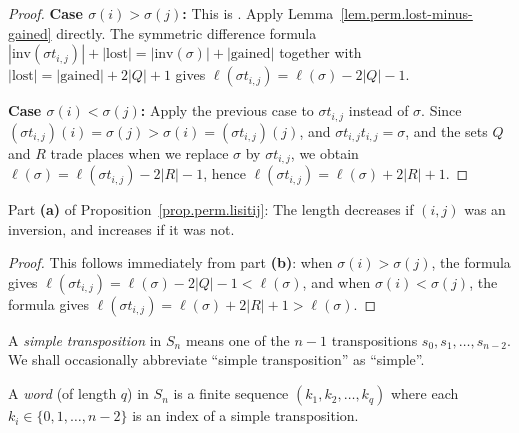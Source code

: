 \begin{proof}
\leanok
\textbf{Case $\sigma(i) > \sigma(j)$:}
This is \cite[Exercise 5.20]{detnotes}.
Apply Lemma~\ref{lem.perm.lost-minus-gained} directly.
The symmetric difference formula
$|\mathrm{inv}(\sigma t_{i,j})| + |\mathrm{lost}| = |\mathrm{inv}(\sigma)| + |\mathrm{gained}|$
together with $|\mathrm{lost}| = |\mathrm{gained}| + 2|Q| + 1$
gives $\ell(\sigma t_{i,j}) = \ell(\sigma) - 2|Q| - 1$.

\textbf{Case $\sigma(i) < \sigma(j)$:}
Apply the previous case to $\sigma t_{i,j}$ instead of $\sigma$.
Since $(\sigma t_{i,j})(i) = \sigma(j) > \sigma(i) = (\sigma t_{i,j})(j)$,
and $\sigma t_{i,j} t_{i,j} = \sigma$,
and the sets $Q$ and $R$ trade places when we replace $\sigma$ by $\sigma t_{i,j}$,
we obtain $\ell(\sigma) = \ell(\sigma t_{i,j}) - 2|R| - 1$, hence
$\ell(\sigma t_{i,j}) = \ell(\sigma) + 2|R| + 1$.
\end{proof}

\begin{theorem}
\label{prop.perm.lisitij.a}
\leanhelper
\leanok
Part \textbf{(a)} of Proposition~\ref{prop.perm.lisitij}: The length decreases
if $(i,j)$ was an inversion, and increases if it was not.
\end{theorem}

\begin{proof}
\leanok
This follows immediately from part \textbf{(b)}: when $\sigma(i) > \sigma(j)$,
the formula gives $\ell(\sigma t_{i,j}) = \ell(\sigma) - 2|Q| - 1 < \ell(\sigma)$,
and when $\sigma(i) < \sigma(j)$, the formula gives
$\ell(\sigma t_{i,j}) = \ell(\sigma) + 2|R| + 1 > \ell(\sigma)$.
\end{proof}


\begin{convention}
\label{conv.perm.simple}
\leanok
A \emph{simple transposition} in $S_n$ means one of the $n-1$ transpositions
$s_0, s_1, \ldots, s_{n-2}$. We shall occasionally abbreviate
``simple transposition'' as ``simple''.
\end{convention}

\begin{definition}
\label{def.perm.Word}
\leanhelper
\leanok
A \emph{word} (of length $q$) in $S_n$ is a finite sequence $(k_1, k_2, \ldots, k_q)$
where each $k_i \in \{0, 1, \ldots, n-2\}$ is an index of a simple transposition.
\end{definition}

